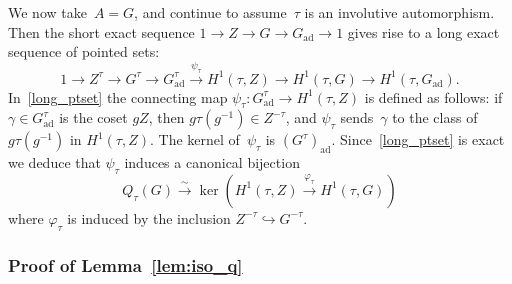 \documentclass[cupthm]{CUP-JNL-JMJ}
\numberwithin{equation}{section}
\theoremstyle{cupplain}
\theoremstyle{cupdefinition}
\theoremstyle{cupremark}
\theoremstyle{cupproof}
\newcommand{\ad}{\mathrm{ad}}
\newcommand{\Gad}{G_\mathrm{ad}}
\begin{document}
We now take~$A=G$, and continue to assume~$\tau$ is an involutive automorphism. Then the short exact sequence $1\rightarrow Z \rightarrow G \rightarrow \Gad\rightarrow 1$ 
gives rise to a long exact sequence of pointed sets:
\begin{equation} \label{long_ptset}
1\rightarrow Z^\tau \rightarrow G^\tau \rightarrow \Gad^{\tau} \overset{\psi_\tau}{\longrightarrow} H^1(\tau,Z)\to H^1(\tau,G)\rightarrow H^1(\tau,\Gad).
\end{equation}
In~\eqref{long_ptset} the connecting map  $ \psi_\tau\colon \Gad^{\tau} \rightarrow H^1(\tau,Z)$ is defined as follows: if $\gamma \in \Gad^{\tau}$ is the coset $gZ$, then $g\tau(g^{-1}) \in Z^{-\tau}$, and $\psi_\tau$ sends~$\gamma$ to the class of $g \tau(g^{-1})$ in $H^1(\tau, Z)$. The kernel of~$\psi_\tau$ is $(G^\tau)_{\ad}$. Since~\eqref{long_ptset} is exact we deduce that $\psi_\tau$ induces a canonical  bijection
\begin{equation} \label{interp_q_cohomology} Q_{\tau}(G) \overset{\sim}{\longrightarrow}  \ker\left(H^1(\tau,Z)\overset{\varphi_\tau}{\longrightarrow} H^1(\tau,G)\right)\end{equation}
where $\varphi_\tau$ is induced by the inclusion $Z^{-\tau} \hookrightarrow G^{-\tau}$. 


 

\subsubsection{Proof of Lemma~\ref{lem:iso_q}}~
\end{document}
